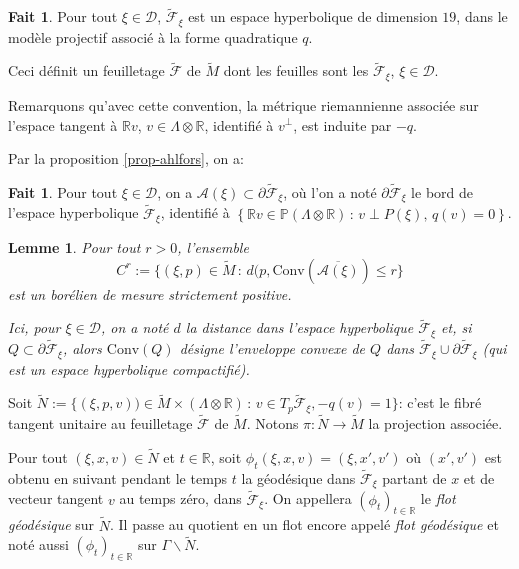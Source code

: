 \documentclass[JEP,XML,SOM,Unicode,francais,published]{cedram}
\newcommand{\R}{\mathbb{R}}
\newtheorem{lem}[thm]{Lemme}
\theoremstyle{definition}
\newtheorem{fait}[thm]{Fait}
\begin{document}
\begin{fait}Pour tout $\xi \in \mathscr{D}$, $\tilde{\mathscr{F}}_\xi$ est un espace hyperbolique de dimension $19$, dans le modèle projectif associé à la forme quadratique $q$.

Ceci définit un feuilletage $\tilde{\mathscr{F}}$ de $\tilde{M}$ dont les feuilles sont les $\tilde{\mathscr{F}}_\xi$, $\xi \in \mathscr{D}$.\end{fait} Remarquons qu'avec cette convention, la métrique riemannienne associée sur l'espace tangent à $\R v$, $v \in \Lambda\otimes\R$, identifié à $v^\perp$, est induite par $-q$.

Par la proposition \ref{prop-ahlfors}, on a:
\begin{fait}
Pour tout $\xi \in \mathscr{D}$, on a $\mathscr{A}(\xi) \subset \partial \tilde{\mathscr{F}}_\xi$, où l'on a noté $\partial \tilde{\mathscr{F}}_\xi$ le bord de l'espace hyperbolique $\tilde{\mathscr{F}}_\xi$, identifié à $\left\{\R v \in \mathbb{P}(\Lambda\otimes \R)\,:\,v \perp P(\xi),\,q(v) = 0\right\}$.
\end{fait}

\begin{lem}
\label{lem-mes-conv}
Pour tout $r > 0$, l'ensemble
\[C^r:= \{(\xi, p)\in \tilde{M}\,:\,d(p, \mathrm{Conv}(\overline{\mathscr{A}(\xi)}) \leq r\}\]
est un borélien de mesure strictement positive.

Ici, pour $\xi \in \mathscr{D}$, on a noté $d$ la distance dans l'espace hyperbolique $\tilde{\mathscr{F}}_\xi$ et, si $Q \subset \partial \tilde{\mathscr{F}}_\xi$, alors $\mathrm{Conv}(Q)$ désigne l'enveloppe convexe de $Q$ dans $\tilde{\mathscr{F}}_\xi \cup \partial \tilde{\mathscr{F}}_\xi$ (qui est un espace hyperbolique compactifié).
\end{lem}
Soit $\tilde{N}:= \{(\xi, p, v)) \in \tilde{M} \times \left(\Lambda\otimes\R\right)\,:\, v \in T_p\tilde{\mathscr{F}}_\xi, -q(v) = 1\}$: c'est le fibré tangent unitaire au feuilletage $\tilde{\mathscr{F}}$ de $\tilde{M}$. Notons $\pi \colon \tilde{N} \to \tilde{M}$ la projection associée.

Pour tout $(\xi, x, v) \in \tilde{N}$ et $t \in \R$, soit $\phi_t(\xi, x, v) = (\xi, x', v')$ où $(x', v')$ est obtenu en suivant pendant le temps $t$ la géodésique dans $\tilde{\mathscr{F}}_\xi$ partant de $x$ et de vecteur tangent $v$ au temps zéro, dans $\tilde{\mathscr{F}}_\xi$. On appellera $(\phi_t)_{t\in\R}$ le \emph{flot géodésique} sur $\tilde{N}$. Il passe au quotient en un flot encore appelé \emph{flot géodésique} et noté aussi $(\phi_t)_{t\in \R}$ sur $\Gamma\backslash \tilde{N}$.
\end{document}
